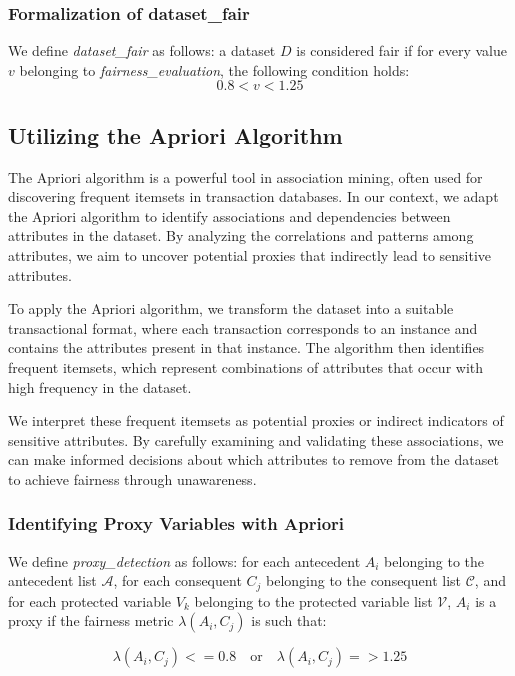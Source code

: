 \documentclass[12pt,a4paper,openright,twoside]{book}
\begin{document}
\subsubsection{Formalization of dataset\_fair}
We define \textit{dataset\_fair} as follows: a dataset \( D \) is considered fair if for every value \( v \) belonging to \textit{fairness\_evaluation}, the following condition holds:
\[ 0.8 < v < 1.25 \]

\subsection{Utilizing the Apriori Algorithm}
The Apriori algorithm is a powerful tool in association mining, often used for discovering frequent itemsets in transaction databases. In our context, we adapt the Apriori algorithm to identify associations and dependencies between attributes in the dataset. By analyzing the correlations and patterns among attributes, we aim to uncover potential proxies that indirectly lead to sensitive attributes.

To apply the Apriori algorithm, we transform the dataset into a suitable transactional format, where each transaction corresponds to an instance and contains the attributes present in that instance. The algorithm then identifies frequent itemsets, which represent combinations of attributes that occur with high frequency in the dataset.

We interpret these frequent itemsets as potential proxies or indirect indicators of sensitive attributes. By carefully examining and validating these associations, we can make informed decisions about which attributes to remove from the dataset to achieve fairness through unawareness.

\subsubsection{Identifying Proxy Variables with Apriori}

We define \textit{proxy\_detection} as follows: for each antecedent \( A_i \) belonging to the antecedent list \( \mathcal{A} \), for each consequent \( C_j \) belonging to the consequent list \( \mathcal{C} \), and for each protected variable \( V_k \) belonging to the protected variable list \( \mathcal{V} \), \( A_i \) is a proxy if the fairness metric \( \lambda(A_i, C_j) \) is such that:

\[\lambda(A_i, C_j) <= 0.8 \quad \text{or} \quad \lambda(A_i, C_j) => 1.25\]
\end{document}
